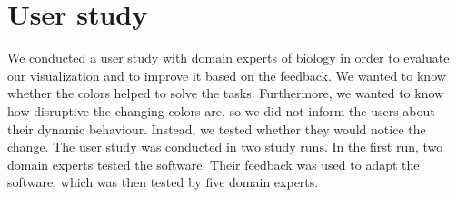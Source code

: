 \documentclass[review,journal]{vgtc}         %
\begin{document}
	
	\section{User study}
	\label{sec:study}
	We conducted a user study with domain experts of biology in order to evaluate our visualization and to improve it based on the feedback.
	We wanted to know whether the colors helped to solve the tasks.
	Furthermore, we wanted to know how disruptive the changing colors are, so we did not inform the users about their dynamic behaviour. 
	Instead, we tested whether they would notice the change.
	The user study was conducted in two study runs. 
	In the first run, two domain experts tested the software. 
	Their feedback was used to adapt the software, which was then tested by five domain experts.
	
\end{document}
